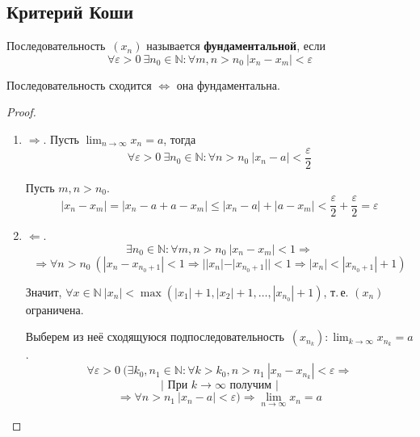 \subsection{Критерий Коши}
\hypertarget{def:fundamental_sequence}{} Последовательность~$(x_n)$ называется \textbf{фундаментальной}, если
\begin{equation*}
\forall \varepsilon > 0 \ \exists n_0 \in \mathbb N \colon \forall m, n > n_0 \ |x_n - x_m| < \varepsilon
\end{equation*}

\begin{theorem}
Последовательность сходится $\Leftrightarrow$ она фундаментальна.
\end{theorem}
\begin{proof}
\begin{enumerate}
	\item $\Rightarrow$. Пусть $\displaystyle \lim_{n \to \infty} x_n = a$, тогда
	\begin{equation*}
	\forall \varepsilon > 0 \ \exists n_0 \in \mathbb N \colon \forall n > n_0 \ |x_n - a| < \frac\varepsilon2
	\end{equation*}
	
	Пусть $m, n > n_0$.
	\begin{equation*}
	|x_n - x_m| = |x_n - a + a - x_m| \leqslant |x_n - a| + |a - x_m| < \frac\varepsilon2 + \frac\varepsilon2 = \varepsilon
	\end{equation*}
	
	\item $\Leftarrow$.
	\begin{equation*}
	\exists n_0 \in \mathbb N \colon \forall m, n > n_0 \ |x_n - x_m| < 1 \Rightarrow
	\end{equation*}
	\begin{equation*}
	\Rightarrow \forall n > n_0 \ (|x_n - x_{n_0 + 1}| < 1 \Rightarrow ||x_n| - |x_{n_0 + 1}|| < 1 \Rightarrow |x_n| < |x_{n_0 + 1}| + 1)
	\end{equation*}
	
	Значит, $\forall x \in \mathbb N \ |x_n| < \max(|x_1| + 1, |x_2| + 1, \ldots, |x_{n_0}| + 1)$, т.\,е. $(x_n)$ ограничена.
	
	Выберем из неё сходящуюся подпоследовательность~$\displaystyle (x_{n_k}): \lim_{k \to \infty} x_{n_k} = a$.
	\begin{equation*}
	\forall \varepsilon > 0 \ (\exists k_0, n_1 \in \mathbb N \colon \forall k > k_0, n > n_1 \ |x_n - x_{n_k}| < \varepsilon \Rightarrow
	\end{equation*}
	\begin{equation*}
	\left| \text{ При } k \to \infty \text{ получим } \right|
	\end{equation*}
	\begin{equation*}
	\Rightarrow \forall n > n_1 \ |x_n - a| < \varepsilon) \Rightarrow \lim_{n \to \infty} x_n = a
	\end{equation*}
\end{enumerate}
\end{proof}